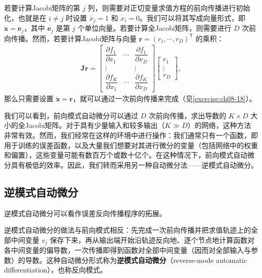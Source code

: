 \documentclass[../../main.tex]{subfiles}
\begin{document}
若要计算Jacobi矩阵的第 $j$ 列，则需要对正切变量求值方程的前向传播进行初始化，也就是在 $i\neq j$ 时设置 $\dot{x}_j=1$ 和 $\dot{x}_i=0$。我们可以将其写成向量形式，即 $\dot{\mathbf{x}}=\mathbf{e}_j$，其中 $\mathbf{e}_j$ 是第 $j$ 个单位向量。若要计算全Jacobi矩阵，则需要进行 $D$ 次前向传播。然而，若要计算Jacobi矩阵与向量 $\mathbf{r}=(r_1,\cdots,r_D)^{\mathsf T}$ 的乘积：
\begin{align}
\mathbf{J}\mathbf{r}=
\begin{bmatrix}
\dfrac{\partial f_1}{\partial x_1} & \cdots & \dfrac{\partial f_1}{\partial x_D}\\
\vdots & & \vdots\\
\dfrac{\partial f_K}{\partial x_1} & \cdots & \dfrac{\partial f_K}{\partial x_D}
\end{bmatrix}
\begin{bmatrix}
r_1\\
\vdots\\
r_D
\end{bmatrix},
\label{align:ch08-Jacobi向量积}
\end{align}
那么只需要设置 $\dot{\mathbf{x}}=\mathbf{r}$，就可以通过一次前向传播来完成（见\cref{exercise:ch08-18}）。

我们可以看到，前向模式自动微分可以通过 $D$ 次前向传播，求出导数的 $K\times D$ 大小的全Jacobi矩阵。对于具有少量输入和较多输出（$K\gg D$）的网络，这种方法非常有效。然而，我们经常在这样的环境中进行操作：我们通常只有一个函数，即用于训练的误差函数，以及大量我们想要对其进行微分的变量（包括网络中的权重和偏置），这些变量可能有数百万个或数十亿个。在这种情况下，前向模式自动微分具有极低的效率。因此，我们转而采用另一种自动微分法——逆模式自动微分。

\subsection{逆模式自动微分}\label{subsection:ch08-逆模式}

逆模式自动微分可以看作误差反向传播程序的拓展。

\begin{definition}[逆模式自动微分]\label{definition:ch08-逆模式}
逆模式自动微分的做法与前向模式相反：先完成一次前向传播并把求值轨迹上的全部中间变量 $v_j$ 保存下来，再从输出端开始沿轨迹反向地、逐个节点地计算函数对各中间变量的偏导数，一次传播即得到函数对全部中间变量（因而对全部输入与参数）的导数。这种自动微分形式称为\textbf{逆模式自动微分}（reverse-mode automatic differentiation），也称反向模式。
\end{definition}
\end{document}
